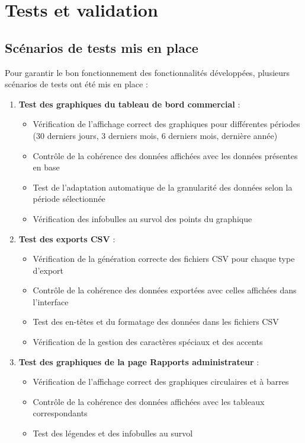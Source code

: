 \documentclass[a4paper,12pt]{report}
\begin{document}
\newpage
\section{Tests et validation}
  \subsection{Scénarios de tests mis en place}
  Pour garantir le bon fonctionnement des fonctionnalités développées, plusieurs scénarios de tests ont été mis en place :
  
  \begin{enumerate}
    \item \textbf{Test des graphiques du tableau de bord commercial} :
    \begin{itemize}
      \item Vérification de l'affichage correct des graphiques pour différentes périodes (30 derniers jours, 3 derniers mois, 6 derniers mois, dernière année)
      \item Contrôle de la cohérence des données affichées avec les données présentes en base
      \item Test de l'adaptation automatique de la granularité des données selon la période sélectionnée
      \item Vérification des infobulles au survol des points du graphique
    \end{itemize}
    
    \item \textbf{Test des exports CSV} :
    \begin{itemize}
      \item Vérification de la génération correcte des fichiers CSV pour chaque type d'export
      \item Contrôle de la cohérence des données exportées avec celles affichées dans l'interface
      \item Test des en-têtes et du formatage des données dans les fichiers CSV
      \item Vérification de la gestion des caractères spéciaux et des accents
    \end{itemize}
    
    \item \textbf{Test des graphiques de la page Rapports administrateur} :
    \begin{itemize}
      \item Vérification de l'affichage correct des graphiques circulaires et à barres
      \item Contrôle de la cohérence des données affichées avec les tableaux correspondants
      \item Test des légendes et des infobulles au survol
    \end{itemize}
    
  \end{enumerate}
\end{document}
